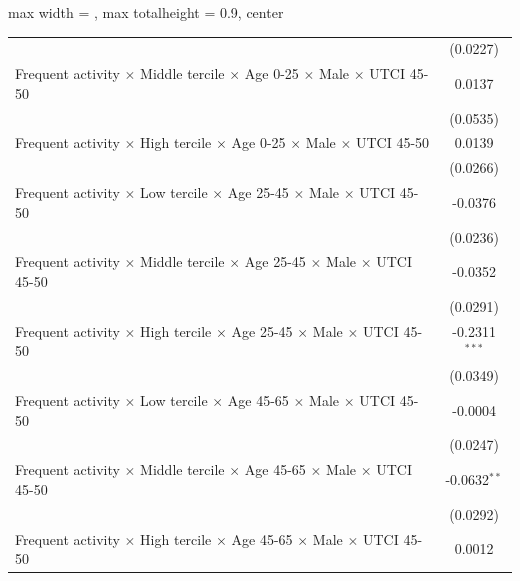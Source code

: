 \begin{table}[htbp]
\begin{adjustbox}{max width = \textwidth, max totalheight = 0.9\textheight, center}
\begin{tabular}{lc}
                                                                                                               & (0.0227)\\   
         Frequent activity $\times$ Middle tercile $\times$ Age 0-25 $\times$ Male $\times$ UTCI 45-50         & 0.0137\\   
                                                                                                               & (0.0535)\\   
         Frequent activity $\times$ High tercile $\times$ Age 0-25 $\times$ Male $\times$ UTCI 45-50           & 0.0139\\   
                                                                                                               & (0.0266)\\   
         Frequent activity $\times$ Low tercile $\times$ Age 25-45 $\times$ Male $\times$ UTCI 45-50           & -0.0376\\   
                                                                                                               & (0.0236)\\   
         Frequent activity $\times$ Middle tercile $\times$ Age 25-45 $\times$ Male $\times$ UTCI 45-50        & -0.0352\\   
                                                                                                               & (0.0291)\\   
         Frequent activity $\times$ High tercile $\times$ Age 25-45 $\times$ Male $\times$ UTCI 45-50          & -0.2311$^{***}$\\   
                                                                                                               & (0.0349)\\   
         Frequent activity $\times$ Low tercile $\times$ Age 45-65 $\times$ Male $\times$ UTCI 45-50           & -0.0004\\   
                                                                                                               & (0.0247)\\   
         Frequent activity $\times$ Middle tercile $\times$ Age 45-65 $\times$ Male $\times$ UTCI 45-50        & -0.0632$^{**}$\\   
                                                                                                               & (0.0292)\\   
         Frequent activity $\times$ High tercile $\times$ Age 45-65 $\times$ Male $\times$ UTCI 45-50          & 0.0012\\   

\end{tabular}
\end{adjustbox}
\end{table}
